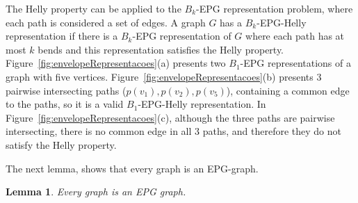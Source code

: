 \documentclass[9pt]{entcs}
\newtheorem{lema}{Lemma}[section]
\newtheorem{prove}{Proof}[section]
\begin{document}
The Helly property can be applied to the $ B_k $-EPG representation problem, where each path is considered a set of edges. A graph $ G $ has a  $ B_k$-EPG-Helly representation if there is a $ B_k $-EPG representation of $G$ where each path has at most $ k $ bends and this representation satisfies the Helly property. %
 Figure~\ref{fig:envelopeRepresentacoes}(a) presents two $B_1$-EPG representations of a graph with five vertices.  Figure~\ref{fig:envelopeRepresentacoes}(b)   presents 3 pairwise intersecting paths ($p(v_1), p(v_2), p(v_5)$), containing a common edge to the paths, so it is a valid $ B_1$-EPG-Helly representation. In Figure~\ref{fig:envelopeRepresentacoes}(c), although the three paths are pairwise intersecting, there is no common edge in all 3 paths, and therefore they do not satisfy the Helly property. 





 The next lemma, shows that every graph is an EPG-graph.
 
 \begin{lema} \cite{golumbic2009} \label{lem:todoGrafoEpg}
 Every graph is an EPG graph.
 \end{lema}
 
 
\end{document}
